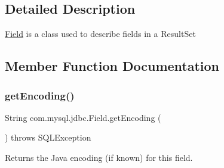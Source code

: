 \subsection{Detailed Description}
\mbox{\hyperlink{classcom_1_1mysql_1_1jdbc_1_1_field}{Field}} is a class used to describe fields in a Result\+Set 

\subsection{Member Function Documentation}
\mbox{\label{classcom_1_1mysql_1_1jdbc_1_1_field_a7deff67d821ec5ec20a675db24b28c47}} 
\subsubsection{\texorpdfstring{get\+Encoding()}{getEncoding()}}
{\footnotesize\ttfamily String com.\+mysql.\+jdbc.\+Field.\+get\+Encoding (\begin{DoxyParamCaption}{ }\end{DoxyParamCaption}) throws S\+Q\+L\+Exception}

Returns the Java encoding (if known) for this field.

